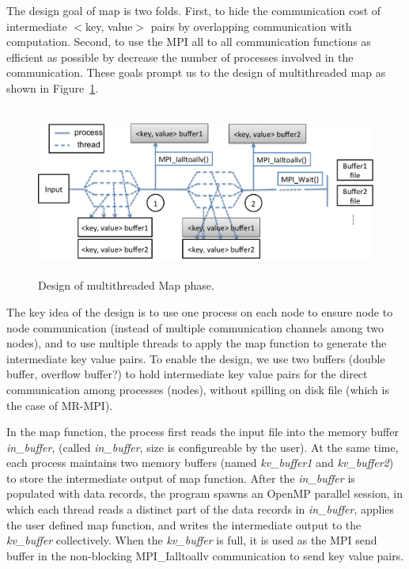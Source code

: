 \documentclass[10pt,conference,compsocconf]{IEEEtran}
\begin{document}
The design goal of map is two folds. First, to hide the communication cost
of intermediate $<$key, value$>$ pairs by overlapping communication
with computation. Second, to use the MPI all to all communication functions
as efficient as possible by decrease the number of processes involved 
in the communication. These goals prompt us to the design of multithreaded
map as shown in Figure~\ref{fig:multithreaded_map}.
\begin{figure}[!htb]
\centering
  \includegraphics[width=0.8\linewidth,height=2.2in]{figs/multithreaded_map_design.png}
  \caption{Design of multithreaded Map phase.}
  \label{fig:multithreaded_map}
\end{figure}

The key idea of the design is to use one process on each node to ensure
node to node communication (instead of multiple communication channels
among two nodes), and to use multiple threads to apply the map function
to generate the intermediate key value pairs. To enable the design, we 
use two buffers (double buffer, overflow buffer?) to hold intermediate 
key value pairs for the direct communication among processes (nodes), without
spilling on disk file (which is the case of MR-MPI).

In the map function, the process first reads the input
file into the memory buffer \textit{in\_buffer}, (called \textit{in\_buffer}, size is configureable 
by the user). At the same time, each process
maintains two memory buffers (named \textit{kv\_buffer1} and \textit{kv\_buffer2}) 
to store the intermediate output of map function. After the \textit{in\_buffer} is
populated with data records, the program spawns an OpenMP parallel
session, in which each thread reads a distinct part of the data records
in \textit{in\_buffer}, applies the user defined map function, and writes the
intermediate output to the \textit{kv\_buffer} collectively. When the 
\textit{kv\_buffer} is full, it is used as the MPI send buffer in the non-blocking
MPI\_Ialltoallv communication to send key value pairs. 
\end{document}
